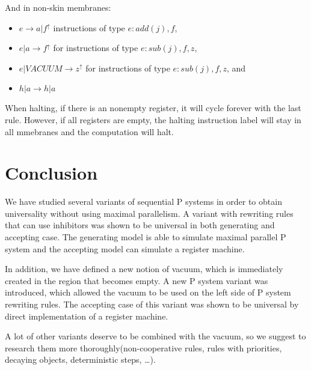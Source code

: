 \documentclass[a4paper,10pt]{article}
\begin{document}
\begin{dokaz}
  And in non-skin membranes:
  
  \begin{itemize}
	\item $e \rightarrow a|f^{\uparrow}$ instructions of type $e : add(j), f$,
	\item $e|a \rightarrow f^{\uparrow}$ for instructions of type $e : sub(j), f, z$,
	\item $e|VACUUM \rightarrow z^{\uparrow}$ for instructions of type $e : sub(j), f, z$, and
	\item $h|a \rightarrow h|a$
  \end{itemize}

  When halting, if there is an nonempty register, it will cycle forever with the last rule. However, if all registers are empty, the halting instruction label will stay in all mmebranes and the computation will halt.
  
\end{dokaz}

\section{Conclusion}
We have studied several variants of sequential P systems in order to obtain universality without using maximal parallelism.
A variant with rewriting rules that can use inhibitors was shown to be universal in both generating and accepting case. The generating model is able to simulate maximal parallel P system and the accepting model can simulate a register machine.

In addition, we have defined a new notion of vacuum, which is immediately created in the region that becomes empty. A new P system variant was introduced, which allowed the vacuum to be used on the left side of P system rewriting rules. The accepting case of this variant was shown to be universal by direct implementation of a register machine.

A lot of other variants deserve to be combined with the vacuum, so we suggest to research them more thoroughly(non-cooperative rules, rules with priorities, decaying objects, deterministic steps, \dots).


\end{document}
